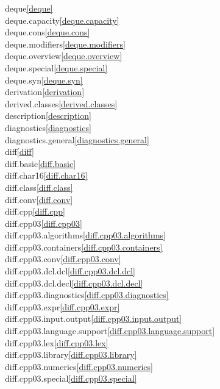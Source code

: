 \begin{multicols}{2}
deque\quad\ref{deque}\\
deque.capacity\quad\ref{deque.capacity}\\
deque.cons\quad\ref{deque.cons}\\
deque.modifiers\quad\ref{deque.modifiers}\\
deque.overview\quad\ref{deque.overview}\\
deque.special\quad\ref{deque.special}\\
deque.syn\quad\ref{deque.syn}\\
derivation\quad\ref{derivation}\\
derived.classes\quad\ref{derived.classes}\\
description\quad\ref{description}\\
diagnostics\quad\ref{diagnostics}\\
diagnostics.general\quad\ref{diagnostics.general}\\
diff\quad\ref{diff}\\
diff.basic\quad\ref{diff.basic}\\
diff.char16\quad\ref{diff.char16}\\
diff.class\quad\ref{diff.class}\\
diff.conv\quad\ref{diff.conv}\\
diff.cpp\quad\ref{diff.cpp}\\
diff.cpp03\quad\ref{diff.cpp03}\\
diff.cpp03.algorithms\quad\ref{diff.cpp03.algorithms}\\
diff.cpp03.containers\quad\ref{diff.cpp03.containers}\\
diff.cpp03.conv\quad\ref{diff.cpp03.conv}\\
diff.cpp03.dcl.dcl\quad\ref{diff.cpp03.dcl.dcl}\\
diff.cpp03.dcl.decl\quad\ref{diff.cpp03.dcl.decl}\\
diff.cpp03.diagnostics\quad\ref{diff.cpp03.diagnostics}\\
diff.cpp03.expr\quad\ref{diff.cpp03.expr}\\
diff.cpp03.input.output\quad\ref{diff.cpp03.input.output}\\
diff.cpp03.language.support\quad\ref{diff.cpp03.language.support}\\
diff.cpp03.lex\quad\ref{diff.cpp03.lex}\\
diff.cpp03.library\quad\ref{diff.cpp03.library}\\
diff.cpp03.numerics\quad\ref{diff.cpp03.numerics}\\
diff.cpp03.special\quad\ref{diff.cpp03.special}\\

\end{multicols}
